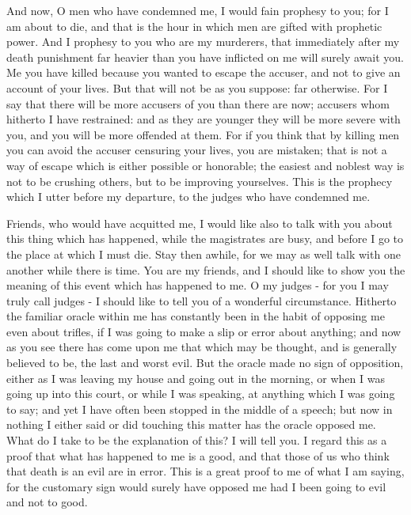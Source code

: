 And now, O men who have condemned me, I would fain prophesy to you;
for I am about to die, and that is the hour in which men are gifted
with prophetic power. And I prophesy to you who are my murderers,
that immediately after my death punishment far heavier than you have
inflicted on me will surely await you. Me you have killed because
you wanted to escape the accuser, and not to give an account of your
lives. But that will not be as you suppose: far otherwise. For I say
that there will be more accusers of you than there are now; accusers
whom hitherto I have restrained: and as they are younger they will
be more severe with you, and you will be more offended at them. For
if you think that by killing men you can avoid the accuser censuring
your lives, you are mistaken; that is not a way of escape which is
either possible or honorable; the easiest and noblest way is not to
be crushing others, but to be improving yourselves. This is the prophecy
which I utter before my departure, to the judges who have condemned
me. 

Friends, who would have acquitted me, I would like also to talk with
you about this thing which has happened, while the magistrates are
busy, and before I go to the place at which I must die. Stay then
awhile, for we may as well talk with one another while there is time.
You are my friends, and I should like to show you the meaning of this
event which has happened to me. O my judges - for you I may truly
call judges - I should like to tell you of a wonderful circumstance.
Hitherto the familiar oracle within me has constantly been in the
habit of opposing me even about trifles, if I was going to make a
slip or error about anything; and now as you see there has come upon
me that which may be thought, and is generally believed to be, the
last and worst evil. But the oracle made no sign of opposition, either
as I was leaving my house and going out in the morning, or when I
was going up into this court, or while I was speaking, at anything
which I was going to say; and yet I have often been stopped in the
middle of a speech; but now in nothing I either said or did touching
this matter has the oracle opposed me. What do I take to be the explanation
of this? I will tell you. I regard this as a proof that what has happened
to me is a good, and that those of us who think that death is an evil
are in error. This is a great proof to me of what I am saying, for
the customary sign would surely have opposed me had I been going to
evil and not to good. 

